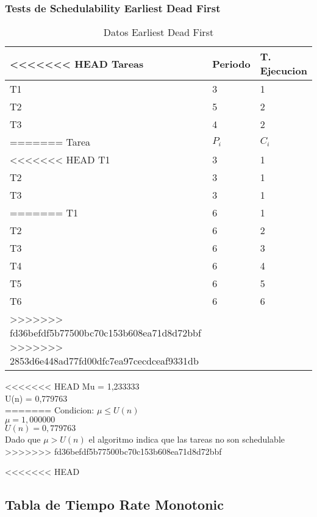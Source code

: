 \documentclass[xcolor=table]{beamer}
\begin{document}
\begin{frame} 
\frametitle{Tests de Schedulability  Earliest Dead First } 
\begin{table} 
\centering 
\begin{tabular}{|l|l|l|} 
\hline 
<<<<<<< HEAD
Tareas & Periodo & T. Ejecucion \\ \hline 
T1   & 3  &  1\\ \hline 
T2   & 5  &  2\\ \hline 
T3   & 4  &  2\\ \hline 
=======
\cellcolor{lightgray}Tarea & \cellcolor{lightgray}$P_i$ & \cellcolor{lightgray}$C_i$ \\ \hline 
<<<<<<< HEAD
T1   & 3  &  1\\ \hline 
T2   & 3  &  1\\ \hline 
T3   & 3  &  1\\ \hline 
=======
T1   & 6  &  1\\ \hline 
T2   & 6  &  2\\ \hline 
T3   & 6  &  3\\ \hline 
T4   & 6  &  4\\ \hline 
T5   & 6  &  5\\ \hline 
T6   & 6  &  6\\ \hline 
>>>>>>> fd36befdf5b77500bc70c153b608ea71d8d72bbf
>>>>>>> 2853d6e448ad77fd00dfc7ea97cecdceaf9331db
\end{tabular} 
\caption{Datos  Earliest Dead First } 
\end{table} 
<<<<<<< HEAD
Mu =  1,233333 \\ 
U(n) =  0,779763 \\ 
=======
Condicion: $\mu \leq U(n)$ \\ 
$\mu =  1,000000 $ \\ 
$U(n) =  0,779763 $ \\ 
Dado que $\mu>U(n)$ el algoritmo indica que las tareas no son schedulable \\ 
>>>>>>> fd36befdf5b77500bc70c153b608ea71d8d72bbf
\end{frame} 

<<<<<<< HEAD
\subsection{Tabla de Tiempo  Rate Monotonic } 
\end{document}
